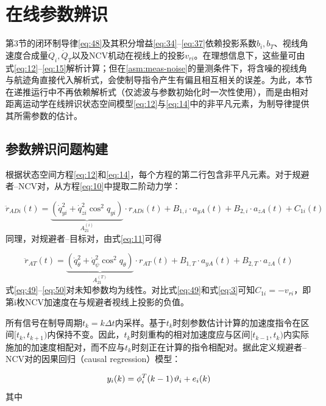 \section{在线参数辨识}
第3节的闭环制导律\eqref{eq:48}及其积分增益\eqref{eq:34}--\eqref{eq:37}依赖投影系数${b_i},{b_T}$、视线角速度合成量${\dot Q_i},{\dot Q_T}$以及NCV机动在视线上的投影${v_{ri}}$。在理想信息下，这些量可由式\eqref{eq:12}--\eqref{eq:15}解析计算；但在\cref{asm:meas-noise}的量测条件下，将含噪的视线角与航迹角直接代入解析式，会使制导指令产生有偏且相互相关的误差。为此，本节在递推运行中不再依赖解析式（仅滤波与参数初始化时一次性使用），而是由相对距离运动学在线辨识状态空间模型\eqref{eq:12}与\eqref{eq:14}中的非平凡元素，为制导律提供其所需参数的估计。

\subsection{参数辨识问题构建}
根据状态空间方程\eqref{eq:12}和\eqref{eq:14}，每个方程的第二行包含非平凡元素。对于规避者–NCV对，从方程\eqref{eq:10}中提取二阶动力学：

\begin{equation}
\label{eq:49}
{\ddot r_{ADi}}(t) = \underbrace {(\dot q_{yi}^2 + \dot q_{zi}^2{{\cos }^2}{q_{yi}})}_{A_{21}^{(i)}} \cdot {r_{ADi}}(t) + {B_{1,i}} \cdot {a_{yA}}(t) + {B_{2,i}} \cdot {a_{zA}}(t) + {C_{1i}}(t)
\end{equation}
同理，对规避者–目标对，由式\eqref{eq:11}可得

\begin{equation}
\label{eq:50}
{\ddot r_{AT}}(t) = \underbrace {(\dot q_\theta ^2 + \dot q_\psi ^2{{\cos }^2}{q_\theta })}_{A_{21}^{(T)}} \cdot {r_{AT}}(t) + {B_{1,T}} \cdot {a_{yA}}(t) + {B_{2,T}} \cdot {a_{zA}}(t)
\end{equation}
式\eqref{eq:49}–\eqref{eq:50}对未知参数均为线性。对比式\eqref{eq:49}和式\eqref{eq:3}可知${C_{1i}} =  - {v_{ri}}$，即第i枚NCV加速度在与规避者视线上投影的负值。

所有信号在制导周期${t_k} = k\Delta t$内采样。基于${t_k}$时刻参数估计计算的加速度指令在区间$[{t_k},{t_{k + 1}})$内保持不变。因此，${t_k}$时刻重构的相对加速度应与区间$[{t_{k - 1}},{t_k})$内实际施加的加速度相配对，而不应与${t_k}$时刻正在计算的指令相配对。据此定义规避者–NCV对的因果回归（causal regression）模型：

\begin{equation}
\label{eq:51}
{y_i}(k) = \phi _i^T(k - 1){\kern 1pt} {\vartheta _i} + {e_i}(k)
\end{equation}
其中

